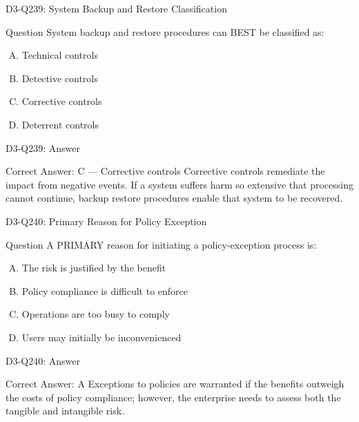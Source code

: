 \documentclass{beamer}
\begin{document}
	\begin{frame}{D3-Q239: System Backup and Restore Classification}
		\begin{block}{Question}
			System backup and restore procedures can BEST be classified as:
		\end{block}
		\begin{enumerate}[(A)]
			\item Technical controls
			\item Detective controls
			\item Corrective controls
			\item Deterrent controls
		\end{enumerate}
	\end{frame}
	\begin{frame}{D3-Q239: Answer}
		\begin{block}{Correct Answer: C --- Corrective controls}
			Corrective controls remediate the impact from negative events. If a system suffers harm so extensive that processing cannot continue, backup restore procedures enable that system to be recovered.
		\end{block}
	\end{frame}
	
	\begin{frame}{D3-Q240: Primary Reason for Policy Exception}
		\begin{block}{Question}
			A PRIMARY reason for initiating a policy-exception process is:
		\end{block}
		\begin{enumerate}[(A)]
			\item The risk is justified by the benefit
			\item Policy compliance is difficult to enforce
			\item Operations are too busy to comply
			\item Users may initially be inconvenienced
		\end{enumerate}
	\end{frame}
	\begin{frame}{D3-Q240: Answer}
		\begin{block}{Correct Answer: A}
			Exceptions to policies are warranted if the benefits outweigh the costs of policy compliance; however, the enterprise needs to assess both the tangible and intangible risk.
		\end{block}
	\end{frame}
	
\end{document}
